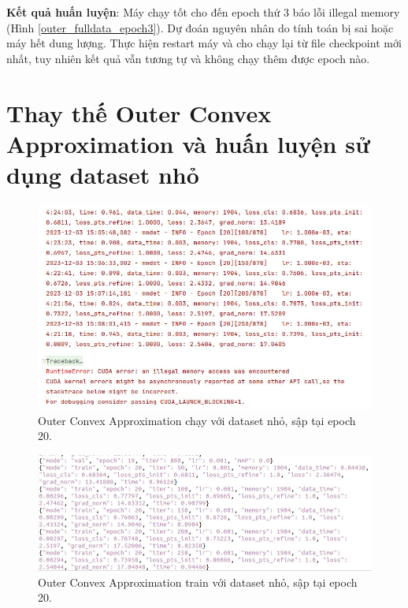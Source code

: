 \documentclass[12pt,a4paper,openany,oneside]{report}
\begin{document}
\textbf{Kết quả huấn luyện}: Máy chạy tốt cho đến epoch thứ 3 báo lỗi illegal memory (Hình \ref{outer_fulldata_epoch3}). Dự đoán nguyên nhân do tính toán bị sai hoặc máy hết dung lượng. Thực hiện restart máy và cho chạy lại từ file checkpoint mới nhất, tuy nhiên kết quả vẫn tương tự và không chạy thêm được epoch nào.
\section{Thay thế Outer Convex Approximation và huấn luyện sử dụng dataset nhỏ}

\begin{figure}[ht!]
	\begin{center}
		\includegraphics[width=450px]{./mmrotate8_1000p_epoch20.JPG}
		\caption{Outer Convex Approximation chạy với dataset nhỏ, sập tại epoch 20.}
		\label{mmrotate8_1000p_epoch20}
	\end{center}
\end{figure} 

\begin{figure}[ht!]
	\begin{center}
		\includegraphics[width=450px]{./ket_qua_file_none_log_json.JPG}
		\caption{Outer Convex Approximation train với dataset nhỏ, sập tại epoch 20.}
		\label{ket_qua_file_none_log_json}
	\end{center}
\end{figure} 
\end{document}
